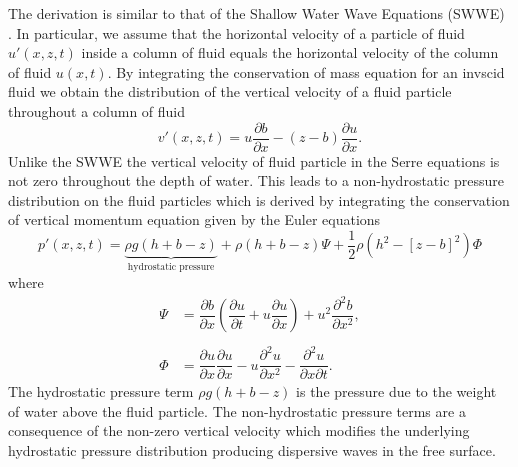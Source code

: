 The derivation is similar to that of the Shallow Water Wave Equations (SWWE) \cite{Liggett-1994}. In particular, we assume that the horizontal velocity of a particle of fluid $u'(x,z,t)$ inside a column of fluid equals the horizontal velocity of the column of fluid $u(x,t)$. By integrating the conservation of mass equation for an invscid fluid we obtain the distribution of the vertical velocity of a fluid particle throughout a column of fluid \cite{Zoppou-2014}
\begin{equation}
v'(x,z,t) = u \frac{\partial b}{\partial x} - (z - b) \frac{\partial u}{\partial x}.
\label{eqn:VertVelSerre}
\end{equation}
Unlike the SWWE the vertical velocity of fluid particle in the Serre equations is not zero throughout the depth of water. This leads to a non-hydrostatic pressure distribution on the fluid particles which is derived by integrating the conservation of vertical momentum equation given by the Euler equations \cite{Zoppou-2014}
\begin{equation}
\label{eqn:SerrePress}
 p'(x,z,t) = \underbrace{ \rho g \left(h + b - z\right)}_{\text{hydrostatic pressure}} + \rho \left(h + b - z\right) \Psi + \frac{1}{2} \rho \left(h^2 - \left[z - b \right]^2\right) {\Phi }
\end{equation} 
where
\begin{subequations}
	\begin{align}
	{ \Psi }  &= \dfrac{\partial b}{\partial x}\left(\dfrac{\partial u}{\partial t} + u\dfrac{\partial u}{\partial x} \right)  + u^2\dfrac{\partial^2 b}{\partial x^2}, \label{eqn:SerreeqnPsi} 
	\\ \nonumber \\
	{ \Phi }  &= \dfrac{\partial u }{\partial x} \dfrac{\partial u}{\partial x} -u \dfrac{\partial^2 u}{\partial x^2}  - \dfrac{\partial^2 u}{\partial x \partial t} . \label{eqn:SerreeqnPhi} 
	\end{align}
	\label{eqn:FullSerreNonConVarDef}
\end{subequations}
The hydrostatic pressure term $\rho g \left(h + b - z\right)$ is the pressure due to the weight of water above the fluid particle. The non-hydrostatic pressure terms are a consequence of the non-zero vertical velocity which modifies the underlying hydrostatic pressure distribution producing dispersive waves in the free surface. 

